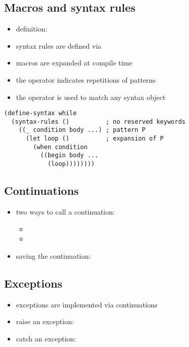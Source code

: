 \documentclass[a4paper,landscape,10pt]{article}
\begin{document}
\begin{multicols*}{2}
  \subsection{Macros and syntax rules}

  \begin{itemize}
    \item definition: 
    \item syntax rules are defined via 
    \item macros are expanded at compile time
    \item the  operator indicates repetitions of patterns
    \item the \iracket{_} operator is used to match any syntax object
  \end{itemize}

  \begin{lstlisting}[language=Racket]
(define-syntax while
  (syntax-rules ()          ; no reserved keywords
    ((_ condition body ...) ; pattern P
      (let loop ()          ; expansion of P
        (when condition
          ((begin body ...
            (loop))))))))
  \end{lstlisting}

  \subsection{Continuations}

  \begin{itemize}
    \item two ways to call a continuation:
          \begin{itemize}
            \item {}
            \item {}
          \end{itemize}
    \item saving the continuation: 
  \end{itemize}

  \subsection{Exceptions}

  \begin{itemize}
    \item exceptions are implemented via continuations
    \item raise an exception: 
    \item catch an exception: 
  \end{itemize}


\end{multicols*}
\end{document}
